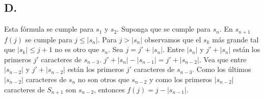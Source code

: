 \documentclass{article}
\begin{document}
\subsection{D.}
Esta fórmula se cumple para $s_1$ y $s_2$. Suponga que se cumple para $s_n$. En $s_{n+1}$ $f(j)$ se cumple para $j \leq |s_n|$. Para $j > |s_n|$ observamos que el $s_k$ más grande tal que $|s_k| \leq j+1$ no es otro que $s_n$. Sea $j = j' + |s_n|$. Entre $|s_n|$ y $j' + |s_n|$ están los primeros $j'$ caracteres de $s_{n-3}$. $j'+|s_{n}| - |s_{n-1}| = j' + |s_{n-2}|$. Vea que entre $|s_{n-2}|$ y $j' + |s_{n-2}|$ están los primeros $j'$ caracteres de $s_{n-3}$. Como los últimos $|s_{n-2}|$ caracteres de $s_n$ no son otros que $s_{n-2}$ y como los primeros $|s_{n-2}|$ caracteres de $S_{n+1}$ son $s_{n-2}$, entonces $f(j) = j - |s_{n-1}|$. 
\end{document}
